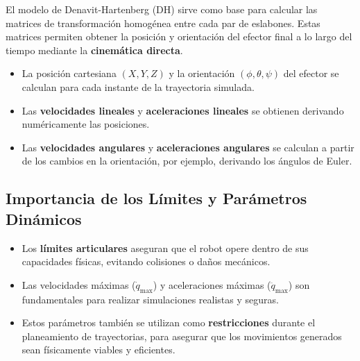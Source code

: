 El modelo de Denavit-Hartenberg (DH) sirve como base para calcular las matrices de transformación homogénea entre cada par de eslabones. Estas matrices permiten obtener la posición y orientación del efector final a lo largo del tiempo mediante la \textbf{cinemática directa}.

\begin{itemize}
	\item La posición cartesiana $(X, Y, Z)$ y la orientación $(\phi, \theta, \psi)$ del efector se calculan para cada instante de la trayectoria simulada.
	\item Las \textbf{velocidades lineales} y \textbf{aceleraciones lineales} se obtienen derivando numéricamente las posiciones.
	\item Las \textbf{velocidades angulares} y \textbf{aceleraciones angulares} se calculan a partir de los cambios en la orientación, por ejemplo, derivando los ángulos de Euler.
\end{itemize}

\vspace{0.5em}
\subsection*{Importancia de los Límites y Parámetros Dinámicos}

\begin{itemize}
	\item Los \textbf{límites articulares} aseguran que el robot opere dentro de sus capacidades físicas, evitando colisiones o daños mecánicos.
	\item Las velocidades máximas ($\dot{q}_{\text{max}}$) y aceleraciones máximas ($\ddot{q}_{\text{max}}$) son fundamentales para realizar simulaciones realistas y seguras.
	\item Estos parámetros también se utilizan como \textbf{restricciones} durante el planeamiento de trayectorias, para asegurar que los movimientos generados sean físicamente viables y eficientes.
\end{itemize}

